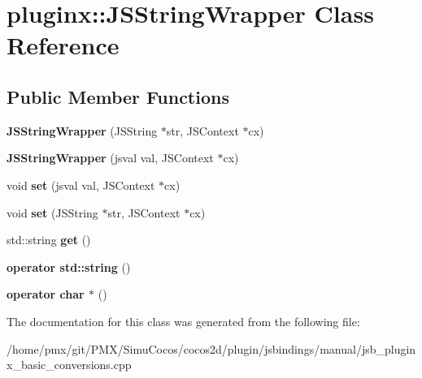 \hypertarget{classpluginx_1_1JSStringWrapper}{}\section{pluginx\+:\+:J\+S\+String\+Wrapper Class Reference}
\label{classpluginx_1_1JSStringWrapper}
\subsection*{Public Member Functions}
\begin{DoxyCompactItemize}
\item 
\mbox{\label{classpluginx_1_1JSStringWrapper_a8e6518d41148dea8207e12f5e09db83b}} 
{\bfseries J\+S\+String\+Wrapper} (J\+S\+String $\ast$str, J\+S\+Context $\ast$cx)
\item 
\mbox{\label{classpluginx_1_1JSStringWrapper_a852f1fd7a0e2466b4d9bd73b92019aa0}} 
{\bfseries J\+S\+String\+Wrapper} (jsval val, J\+S\+Context $\ast$cx)
\item 
\mbox{\label{classpluginx_1_1JSStringWrapper_a5a001c9cffbe8b3225a6fb47e01e9fb9}} 
void {\bfseries set} (jsval val, J\+S\+Context $\ast$cx)
\item 
\mbox{\label{classpluginx_1_1JSStringWrapper_a7fd4e05b34b62b408ac6a8239b6fadd8}} 
void {\bfseries set} (J\+S\+String $\ast$str, J\+S\+Context $\ast$cx)
\item 
\mbox{\label{classpluginx_1_1JSStringWrapper_ae91fbdc3ee349eb9e697a035d9a106d3}} 
std\+::string {\bfseries get} ()
\item 
\mbox{\label{classpluginx_1_1JSStringWrapper_a4afa20254e0b831c223cb31de9ff9888}} 
{\bfseries operator std\+::string} ()
\item 
\mbox{\label{classpluginx_1_1JSStringWrapper_af28cc1b315d409e0b2d026dca10f80d7}} 
{\bfseries operator char $\ast$} ()
\end{DoxyCompactItemize}


The documentation for this class was generated from the following file\+:\begin{DoxyCompactItemize}
\item 
/home/pmx/git/\+P\+M\+X/\+Simu\+Cocos/cocos2d/plugin/jsbindings/manual/jsb\+\_\+pluginx\+\_\+basic\+\_\+conversions.\+cpp\end{DoxyCompactItemize}
